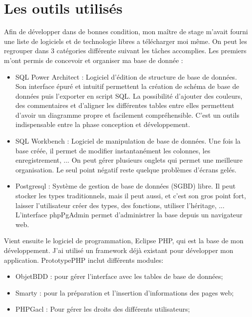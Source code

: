 \documentclass[12pt,a4paper,titlepage,twoside]{report}
\begin{document}
\section{Les outils utilisés}
Afin de développer dans de bonnes condition, mon maître de stage m'avait fourni une liste de logiciels et de technologie libres a télécharger moi même. On peut les regrouper dans 3 catégories différente suivant les tâches accomplies. Les premiers m'ont permis de concevoir et organiser ma base de donnée :
\newline 
\begin{itemize}
\item SQL Power Architect : Logiciel d'édition de structure de base de données. Son interface épuré et intuitif permettent la création de schéma de base de données puis l'exporter en script SQL. La possibilité d'ajouter des couleurs, des commentaires et d'aligner les différentes tables entre elles permettent d'avoir un diagramme propre et facilement compréhensible. C'est un outils indispensable entre la phase conception et développement.
\item SQL Workbench : Logiciel de manipulation de base de données. Une fois la base créée, il permet de modifier instantanément les colonnes, les enregistrement, ...  On peut gérer plusieurs onglets qui permet une meilleure organisation. Le seul point négatif reste quelque problèmes d'écrans gelés.
\item Postgresql : Système de gestion de base de données (SGBD) libre. Il peut stocker les types traditionnels, mais il peut aussi, et c'est son gros point fort, laisser l'utilisateur créer des types, des fonctions, utiliser l'héritage, ... L'interface phpPgAdmin permet d'administrer la base depuis un navigateur web.\newline
\end{itemize}	

Vient ensuite le logiciel de programmation, Eclipse PHP, qui est la base de mon développement. J'ai utilisé un framework déjà existant pour développer mon application. PrototypePHP inclut différents modules:
\newline
\begin{itemize}
\item ObjetBDD : pour gérer l'interface avec les tables de base de données;
\item Smarty : pour la préparation et l'insertion d'informations des pages web;
\item PHPGacl : Pour gérer les droits des différents utilisateurs; \newline
\end{itemize}
\end{document}
